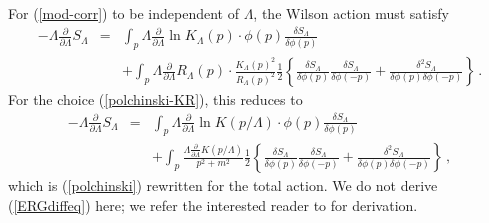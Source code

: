 \documentclass[aps,prd,preprint,groupedaddress,preprintnumbers,longbibliography]{revtex4-1}
\newcommand{\nn}{\nonumber}
\newcommand{\lb}{\left\lbrace}
\newcommand{\rb}{\right\rbrace}
\newcommand{\SL}{S_\Lambda}
\begin{document}
For (\ref{mod-corr}) to be independent of $\Lambda$, the Wilson action
must satisfy
\begin{eqnarray}
- \Lambda \frac{\partial}{\partial \Lambda} \SL &=& \int_p \Lambda
\frac{\partial}{\partial \Lambda} \ln K_\Lambda (p) \cdot \phi (p)
\frac{\delta \SL}{\delta \phi (p)}\nn\\
&& + \int_p \Lambda \frac{\partial}{\partial \Lambda} R_\Lambda (p)
\cdot \frac{K_\Lambda (p)^2}{R_\Lambda (p)^2} \frac{1}{2} \lb
\frac{\delta \SL}{\delta \phi (p)} \frac{\delta \SL}{\delta \phi (-p)}
+ \frac{\delta^2 \SL}{\delta \phi (p) \delta \phi (-p)} \rb\,.
\label{ERGdiffeq}
\end{eqnarray}
For the choice (\ref{polchinski-KR}), this reduces to
\begin{eqnarray}
- \Lambda \frac{\partial}{\partial \Lambda} \SL &=& \int_p \Lambda
\frac{\partial}{\partial \Lambda} \ln K(p/\Lambda) \cdot \phi (p)
\frac{\delta \SL}{\delta \phi (p)}\nn\\
&& + \int_p \frac{\Lambda \frac{\partial}{\partial \Lambda}
  K(p/\Lambda)}{p^2+m^2} \frac{1}{2} \lb 
\frac{\delta \SL}{\delta \phi (p)} \frac{\delta \SL}{\delta \phi (-p)}
+ \frac{\delta^2 \SL}{\delta \phi (p) \delta \phi (-p)} \rb\,,
\end{eqnarray}
which is (\ref{polchinski}) rewritten for the total action.  We do not
derive (\ref{ERGdiffeq}) here; we refer the interested reader to
\cite{Sonoda:2015bla} for derivation.
\end{document}
